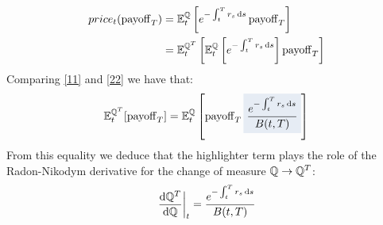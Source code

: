 \begin{align}
    price_t(\operatorname{payoff}_T) &= \mathbb{E}_t^{\mathbb{Q}} \left[e^{-\int_t^T r_s\,\dd s}\operatorname{payoff}_T\right] \label{11} \\
    &= 
    \mathbb{E}_t^{\mathbb{Q}^T}\left[\mathbb{E}_t^{\mathbb{Q}} \left[e^{-\int_t^T r_s\,\dd s}\right]\operatorname{payoff}_T\right] \label{22}
\end{align}
Comparing \eqref{11} and \eqref{22} we have that:
\begin{equation}
    \mathbb{E}_t^{\Qmeas^T}[\pay_T] = \mathbb{E}_t^{\Qmeas}\left[\pay_T \hlc{mylightblue}{\frac{e^{-\int_t^T r_s\,\dd s}}{B(t,T)}}\right]
\end{equation}
From this equality we deduce that the highlighter term plays the role of the Radon-Nikodym derivative for the change of measure $\mathbb{Q}\to\mathbb{Q}^T$:
\begin{equation}
    \eval{\frac{\dd \Qmeas^T}{\dd \Qmeas}}_t = \frac{e^{-\int_t^T r_s\,\dd s}}{B(t,T)}
\end{equation}